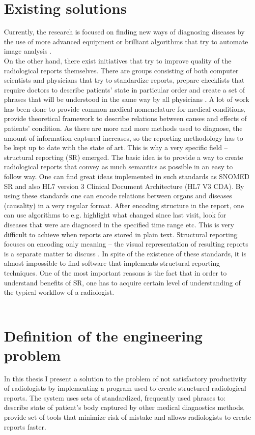 \documentclass[12pt, twoside, openany]{report}
\theoremstyle{definition}
\begin{document}
\section{Existing solutions}
Currently, the research is focused on finding new ways of diagnosing diseases by  the use of more advanced equipment or brilliant algorithms that try to automate image analysis \cite{ai}. \\
On the other hand, there exist initiatives that try to improve quality of the radiological reports themselves. There are groups consisting of both computer scientists and physicians that try to standardize reports, prepare checklists that require doctors to describe patients' state in particular order and create a set of phrases that will be understood in the same way by all physicians \cite{snomed}. A lot of work has been done to provide common medical nomenclature for medical conditions, provide theoretical framework to describe relations between causes and effects of patients' condition. As there are more and more methods used to diagnose, the amount of information captured increases, so the reporting methodology has to be kept up to date with the state of art. This is why a very specific field -- structural reporting (SR) emerged. The basic idea is to provide a way to create radiological reports that convey as much semantics as possible in an easy to follow way. One can find great ideas implemented in such standards as SNOMED SR \cite{sr} and also HL7 version 3 Clinical Document Architecture (HL7 V3 CDA). By using these standards one can encode relations between organs and diseases (causality) in a very regular format. After encoding structure in the report, one can use algorithms to e.g. highlight what changed since last visit, look for diseases that were are diagnosed in the specified time range etc. This is very difficult to achieve when reports are stored in plain text. Structural reporting focuses on encoding only meaning -- the visual representation of resulting reports is a separate matter to discuss \cite{sr}.
In spite of the existence of these standards, it is almost impossible to find software that implements structural reporting techniques. One of the most important reasons is the fact that in order to understand benefits of SR, one has to acquire certain level of understanding of the typical workflow of a radiologist. 
\\ \\
\section{Definition of the engineering problem}
In this thesis I present a solution to the problem of not satisfactory productivity of radiologists by implementing a program used to create structured radiological reports. The system uses sets of standardized, frequently used phrases to: describe state of patient's body captured by other medical diagnostics methods, provide set of tools that minimize risk of mistake and allows radiologists to create reports faster.
\end{document}
